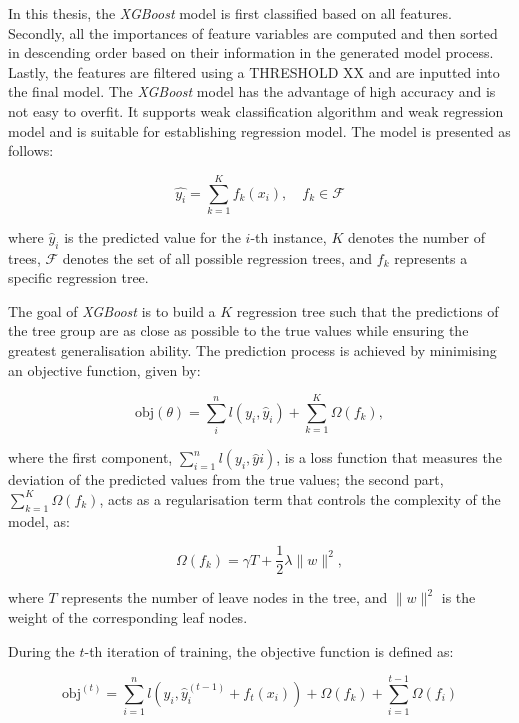 \documentclass[
  11pt,
]{article}
\begin{document}
In this thesis, the \emph{XGBoost} model is first classified based on
all features. Secondly, all the importances of feature variables are
computed and then sorted in descending order based on their information
in the generated model process. Lastly, the features are filtered using
a THRESHOLD XX and are inputted into the final model. The \emph{XGBoost}
model has the advantage of high accuracy and is not easy to overfit. It
supports weak classification algorithm and weak regression model and is
suitable for establishing regression model. The model is presented as
follows:

\begin{equation}
\hat{y_i} = \sum_{k=1}^{K} f_k(x_i), \quad f_k \in \mathcal{F}
\end{equation}

where \(\hat{y}_i\) is the predicted value for the \(i\)-th instance,
\(K\) denotes the number of trees, \(\mathcal{F}\) denotes the set of
all possible regression trees, and \(f_k\) represents a specific
regression tree.

The goal of \emph{XGBoost} is to build a \(K\) regression tree such that
the predictions of the tree group are as close as possible to the true
values while ensuring the greatest generalisation ability. The
prediction process is achieved by minimising an objective function,
given by:

\begin{equation}
\text{obj}(\theta) = \sum_{i}^{n} l(y_i, \hat{y}_i) + \sum_{k=1}^{K} \Omega(f_k),
\end{equation}

where the first component, \(\sum_{i=1}^{n} l(y_i, \hat{y}i)\), is a
loss function that measures the deviation of the predicted values from
the true values; the second part, \(\sum_{k=1}^{K} \Omega(f_k)\), acts
as a regularisation term that controls the complexity of the model, as:

\begin{equation}
\Omega(f_k) = \gamma T + \frac{1}{2} \lambda \lVert w \rVert^2,
\end{equation}

where \(T\) represents the number of leave nodes in the tree, and
\(\lVert w \rVert^2\) is the weight of the corresponding leaf nodes.

During the \(t\)-th iteration of training, the objective function is
defined as:

\begin{equation}
\text{obj}^{(t)} = \sum_{i=1}^{n} l\left(y_i, \hat{y}_i^{(t-1)} + f_t(x_i)\right) + \Omega(f_k) + \sum_{i=1}^{t-1} \Omega(f_i)
\end{equation}
\end{document}
